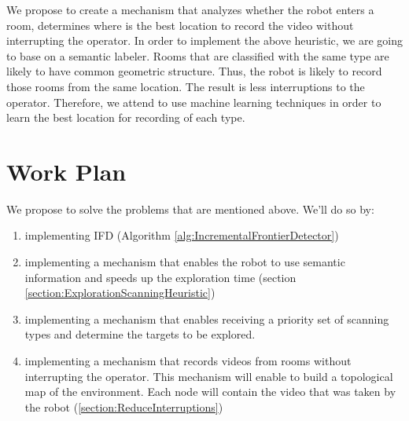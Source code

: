\documentclass[a4paper,10pt]{article}
\begin{document}
We propose to create a mechanism that analyzes whether the robot enters a room,
determines where is the best location to record the video without interrupting
the operator. In order to implement the above heuristic, we are going to base on
a semantic labeler. Rooms that are classified with the same type are likely
to have common geometric structure. Thus, the robot is likely to record those
rooms from the same location. The result is less interruptions to the operator.
Therefore, we attend to use machine learning techniques in order to learn the
best location for recording of each type. 
 



\section{Work Plan}
We propose to solve the problems that are mentioned above. We'll do so by:

\begin{enumerate}
 
  \item implementing IFD (Algorithm \ref{alg:IncrementalFrontierDetector}) 
  
  \item implementing a mechanism that enables the
  robot to use semantic information and speeds up the
  exploration time (section \ref{section:ExplorationScanningHeuristic})
  
  \item implementing a mechanism that enables receiving a priority set of
  scanning types and determine the targets to be explored.
  
  \item implementing a mechanism that records videos from rooms without
  interrupting the operator. This mechanism will enable to build a topological
  map of the environment. Each node will contain the video that was taken by
  the robot (\ref{section:ReduceInterruptions})
\end{enumerate}
\end{document}
